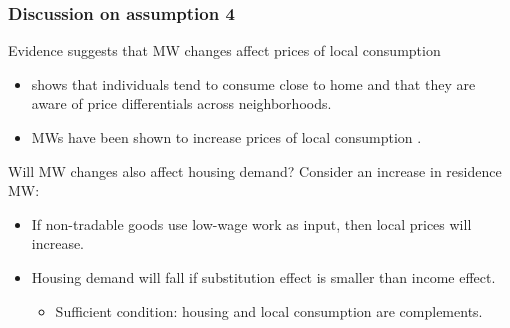 \documentclass[aspectratio=169, t]{beamer}
\begin{document}
\begin{frame}[label = discuss4]
    \frametitle{Discussion on assumption 4}

    Evidence suggests that MW changes affect prices of local consumption
    \begin{itemize}
        \vspace{1mm}
        \item \textcite{MiyauchiEtAl2021} shows that individuals tend to consume close to home and that 
        they are aware of price differentials across neighborhoods.
        \vspace{1mm}
        \item MWs have been shown to increase prices of local consumption 
        \parencite[e.g.,][]{AllegrettoReich2018, Leung2021}.
    \end{itemize}

    \pause 
    \vspace{2mm}

    Will MW changes also affect housing demand? Consider an increase in residence MW:
    \begin{itemize}
        \vspace{1mm}
        \item If non-tradable goods use low-wage work as input, then local prices will increase.
        \vspace{1mm}
        \item Housing demand will fall if substitution effect is smaller than income effect.
        \begin{itemize}
            \item Sufficient condition: housing and local consumption are complements.
        \end{itemize}
    \end{itemize}

\end{frame}
\end{document}
